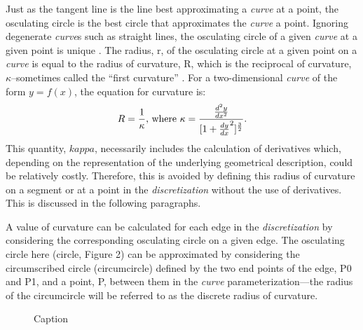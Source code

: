 \noindent Just as the tangent line is the line best approximating a \textit{curve} at a point, the osculating circle is the best circle that approximates the \textit{curve} a point. Ignoring degenerate \textit{curve}s such as straight lines, the osculating circle of a given \textit{curve} at a given point is unique \cite{gray97}. The radius, r, of the osculating circle at a given point on a \textit{curve} is equal to the radius of curvature, R, which is the reciprocal of curvature, $\kappa$--sometimes called the ``first curvature'' \cite{kreyszig91}. For a two-dimensional \textit{curve} of the form $y=f(x)$, the equation for curvature is:
\[ 
R=\frac{1}{\kappa} \textnormal{, where } 
\kappa=\frac{\frac{d^2y}{dx^2}}{[1+\frac{dy}{dx}^2 ]^\frac{3}{2}}. 
\]
\noindent This quantity, $kappa$, necessarily includes the calculation of 
derivatives which, depending on the representation of the underlying geometrical description, could be relatively costly. Therefore, this is avoided by defining this radius of curvature on a segment or at a point in the \textit{discretization} without the use of derivatives. This is discussed in the following paragraphs.

A value of curvature can be calculated for each edge in the \textit{discretization} by considering the corresponding osculating circle on a given edge. The osculating circle here (circle, Figure 2) can be approximated by considering the circumscribed circle (circumcircle) \cite{casey1888} defined by the two end points of the edge, P0 and P1, and a point, P, between them in the \textit{curve} parameterization—the radius of the circumcircle will be referred to as the discrete radius of curvature.

\begin{figure}[h!]
  \caption{\label{CircumscribedCircle} Caption}
\end{figure}

